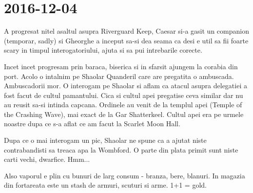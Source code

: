 \documentclass[12pt,oneside]{book}
\begin{document}
\section{2016-12-04}

A progresat nitel asaltul asupra Riverguard Keep, Caesar si-a gasit un companion (temporar, sadly) si Gheorghe a inceput sa-si dea seama ca desi e util sa fii foarte scary in timpul interogatoriului, ajuta si sa pui intrebarile corecte.

Incet incet progresam prin baraca, biserica si in sfarsit ajungem la corabia din port.
Acolo o intalnim pe Shaolar Quanderil care are pregatita o ambuscada. Ambuscadorii mor. O interogam pe Shaolar si aflam ca atacul asupra delegatiei a fost facut de cultul pamantului. Cica si cultul apei pregatise ceva similar dar nu au reusit sa-si intinda capcana. Ordinele au venit de la templul apei (Temple of the Crashing Wave), mai exact de la Gar Shatterkeel.
Cultul apei era pe urmele noastre dupa ce s-a aflat ce am facut la Scarlet Moon Hall.

Dupa ce o mai interogam un pic, Shaolar  ne spune ca a ajutat niste contrabandisti sa treaca apa la Wombford. O parte din plata primit sunt niste carti vechi, dwarfice.
Hmm...

Also vaporul e plin cu bunuri de larg consum - branza, bere, blanuri. In magazia din fortareata este un stash de armuri, scuturi si arme. 1+1 = gold.

\newpage
\end{document}
